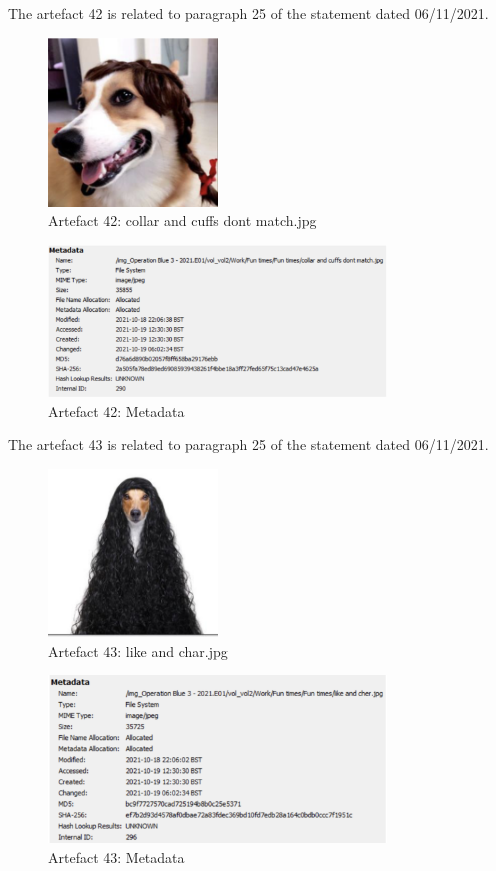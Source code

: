 The artefact 42 is related to paragraph 25 of the statement dated 06/11/2021.
\begin{figure}[H]
  \centering
  \includegraphics[width=0.4\textwidth]{figures/artefact42}
  \caption{Artefact 42: collar and cuffs dont match.jpg}
  \label{f:artefact42}
\end{figure}
\begin{figure}[H]
  \centering
  \includegraphics[width=0.8\textwidth]{figures/meta42}
  \caption{Artefact 42: Metadata}
  \label{f:meta42}
\end{figure}
The artefact 43 is related to paragraph 25 of the statement dated 06/11/2021.
\begin{figure}[H]
  \centering
  \includegraphics[width=0.4\textwidth]{figures/artefact43}
  \caption{Artefact 43: like and char.jpg}
  \label{f:artefact43}
\end{figure}
\begin{figure}[H]
  \centering
  \includegraphics[width=0.8\textwidth]{figures/meta43}
  \caption{Artefact 43: Metadata}
  \label{f:meta43}
\end{figure}
